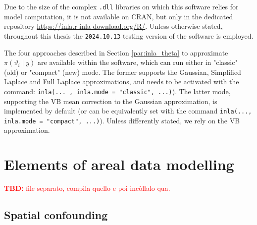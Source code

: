 \documentclass[openany]{book}
\begin{document}

Due to the size of the complex \texttt{.dll} libraries on which this software relies for model computation, it is not available on CRAN, but only in the dedicated repository \url{https://inla.r-inla-download.org/R/}. Unless otherwise stated, throughout this thesis the \texttt{2024.10.13} testing version of the software is employed.

The four approaches described in Section \ref{par:inla_theta} to approximate $\pi(\vartheta_i \mid y)$ are available within the software, which can run either in "classic" (old) or "compact" (new) mode. The former supports the Gaussian, Simplified Laplace and Full Laplace approximations, and needs to be activated with the command: \texttt{inla(... , inla.mode = "classic", ...)}). The latter mode, supporting the VB mean correction to the Gaussian approximation, is implemented by default (or can be equivalently set with the command \texttt{inla(..., inla.mode = "compact", ...)}). Unless differently stated, we rely on the VB approximation. 







%
%

%
\chapter{Elements of areal data modelling} \label{chapter:theory}
\textcolor{red}{\textbf{TBD:} file separato, compila quello e poi incòllalo qua.}
\section{Spatial confounding}
\end{document}
